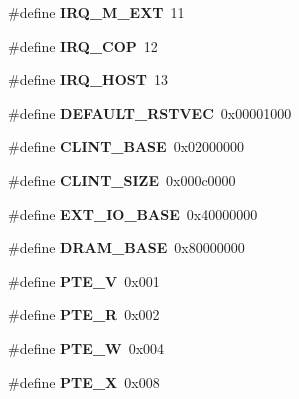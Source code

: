 \begin{DoxyCompactItemize}
\#define {\bfseries I\+R\+Q\+\_\+\+M\+\_\+\+E\+XT}~11
\item 
\mbox{\label{riscv-utility_8h_a26e341b99075274d38face5be46579a6}} 
\#define {\bfseries I\+R\+Q\+\_\+\+C\+OP}~12
\item 
\mbox{\label{riscv-utility_8h_ab12a3e27140376a52c9f9999404a73f6}} 
\#define {\bfseries I\+R\+Q\+\_\+\+H\+O\+ST}~13
\item 
\mbox{\label{riscv-utility_8h_a325a70437a7ebec841da1fc84384c14c}} 
\#define {\bfseries D\+E\+F\+A\+U\+L\+T\+\_\+\+R\+S\+T\+V\+EC}~0x00001000
\item 
\mbox{\label{riscv-utility_8h_adf17cca244ad8b81238cb56911c09c6e}} 
\#define {\bfseries C\+L\+I\+N\+T\+\_\+\+B\+A\+SE}~0x02000000
\item 
\mbox{\label{riscv-utility_8h_a6e8c33caacb405a8bde39c35c02928d0}} 
\#define {\bfseries C\+L\+I\+N\+T\+\_\+\+S\+I\+ZE}~0x000c0000
\item 
\mbox{\label{riscv-utility_8h_aa200ded9184ef068f4fdbb302e7203d9}} 
\#define {\bfseries E\+X\+T\+\_\+\+I\+O\+\_\+\+B\+A\+SE}~0x40000000
\item 
\mbox{\label{riscv-utility_8h_af664e1a9045803369e50e29fdc1ca530}} 
\#define {\bfseries D\+R\+A\+M\+\_\+\+B\+A\+SE}~0x80000000
\item 
\mbox{\label{riscv-utility_8h_a9a3c738182007bee471e44aae04c386f}} 
\#define {\bfseries P\+T\+E\+\_\+V}~0x001
\item 
\mbox{\label{riscv-utility_8h_a3a188134a2cbd69e161521fb169ecd08}} 
\#define {\bfseries P\+T\+E\+\_\+R}~0x002
\item 
\mbox{\label{riscv-utility_8h_a058fcbcc3e1eab2c09c68b3e5221c545}} 
\#define {\bfseries P\+T\+E\+\_\+W}~0x004
\item 
\mbox{\label{riscv-utility_8h_ae20c834a93867eedc88007621c74ad55}} 
\#define {\bfseries P\+T\+E\+\_\+X}~0x008
\item 

\end{DoxyCompactItemize}
